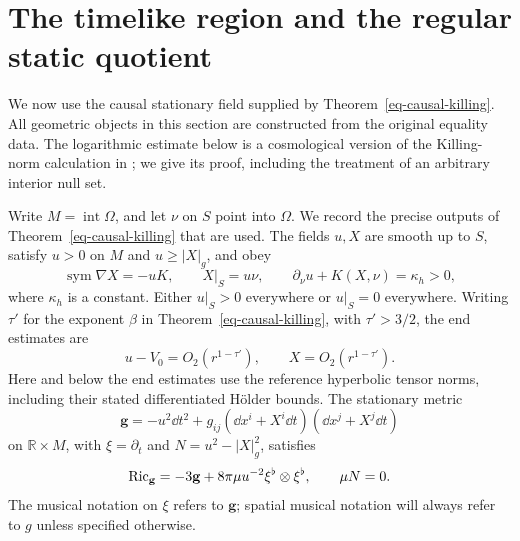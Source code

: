 \section{The timelike region and the regular static quotient}
\label{geo-section}

We now use the causal stationary field supplied by
Theorem~\ref{eq-causal-killing}.  All geometric objects in this section are
constructed from the original equality data.  The logarithmic estimate below
is a cosmological version of the Killing-norm calculation in
\cite[Section~5.3]{internalflat}; we give its proof, including the treatment of an
arbitrary interior null set.

Write $M=\operatorname{int}\Omega$, and let $\nu$ on $S$ point into $\Omega$.
We record the precise outputs of Theorem~\ref{eq-causal-killing} that are used.
The fields $u,X$ are smooth up to $S$, satisfy $u>0$ on $M$ and $u\geq|X|_g$,
and obey
\begin{equation}
 \operatorname{sym}\nabla X=-uK,
 \qquad X|_S=u\nu,
 \qquad \partial_\nu u+K(X,\nu)=\kappa_h>0,
 \label{geo-input-killing}
\end{equation}
where $\kappa_h$ is a constant.  Either $u|_S>0$ everywhere or $u|_S=0$
everywhere. Writing $\tau'$ for the exponent $\beta$ in
Theorem~\ref{eq-causal-killing}, with $\tau'>3/2$, the end estimates are
\begin{equation}
 u-V_0=O_2(r^{1-\tau'}),\qquad X=O_2(r^{1-\tau'}).
 \label{geo-input-end}
\end{equation}
Here and below the end estimates use the reference hyperbolic tensor norms,
including their stated differentiated H\"older bounds.  The stationary metric
\begin{equation}
 \mathbf g=-u^2\dd t^2+
 g_{ij}(\dd x^i+X^i\dd t)(\dd x^j+X^j\dd t)
 \label{geo-stationary-metric}
\end{equation}
on $\mathbb R\times M$, with $\xi=\partial_t$ and
$N=u^2-|X|_g^2$, satisfies
\begin{equation}
 \operatorname{Ric}_{\mathbf g}=-3\mathbf g+
       8\pi\mu u^{-2}\xi^\flat\otimes\xi^\flat,
 \qquad \mu N=0.
 \label{geo-input-ricci}
\end{equation}
The musical notation on $\xi$ refers to $\mathbf g$; spatial musical notation
will always refer to $g$ unless specified otherwise.

